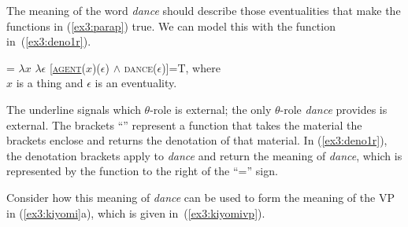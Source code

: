 The meaning of the word \emph{dance} should describe those eventualities that make the functions in (\ref{ex3:parap}) true. We can model this with the function in~(\ref{ex3:deno1r}).
\begin{exe}
	\raggedright
	\ex \label{ex3:deno1r} 
	 = $\lambda x$ $\lambda \epsilon$ [\underline{\textsc{agent}}($x$)($\epsilon$) $\wedge$ \textsc{dance}($\epsilon$)]=T, where\\ 
	$x$ is a thing and $\epsilon$ is an eventuality.
\end{exe}
The underline signals which $\theta$-role is external; the only $\theta$-role \emph{dance} provides is external. The brackets ``\denotes{\ }'' represent a function that takes the material the brackets enclose and returns the denotation of that material. In (\ref{ex3:deno1r}), the denotation brackets apply to \emph{dance} and return the meaning of \emph{dance}, which is represented by the function to the right of the ``='' sign.

Consider how this meaning of \emph{dance} can be used to form the meaning of the VP in (\ref{ex3:kiyomi}a), which is given in~(\ref{ex3:kiyomivp}).%
%
%
%

